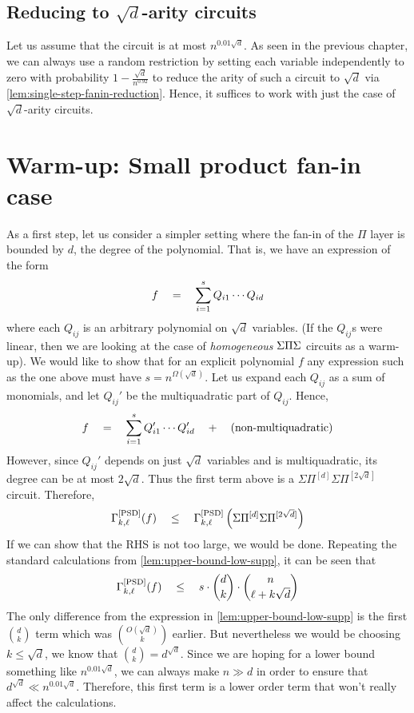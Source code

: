 \subsection*{Reducing to $\sqrt{d}$-arity circuits}

Let us assume that the circuit is at most $n^{0.01\sqrt{d}}$. As seen in the previous chapter, we can always use a random restriction by setting each variable independently to zero with probability $1 - \frac{\sqrt{d}}{n^{0.92}}$ to reduce the arity of such a circuit to $\sqrt{d}$ via \autoref{lem:single-step-fanin-reduction}. Hence, it suffices to work with just the case of $\sqrt{d}$-arity circuits. 



\section{Warm-up: Small product fan-in case}

As a first step, let us consider a simpler setting where the fan-in of the $\Pi$ layer is bounded by $d$, the degree of the polynomial. That is, we have an expression of the form
\[
f \quad = \quad \sum_{i=1}^s Q_{i1} \cdots Q_{id}
\]
where each $Q_{ij}$ is an arbitrary polynomial on $\sqrt{d}$ variables. (If the $Q_{ij}$s were linear, then we are looking at the case of \emph{homogeneous} $\Sigma\Pi\Sigma$ circuits as a warm-up). We would like to show that for an explicit polynomial $f$ any expression such as the one above must have $s = n^{\Omega(\sqrt{d})}$. Let us expand each $Q_{ij}$ as a sum of monomials, and let $Q_{ij}'$ be the multiquadratic part of $Q_{ij}$. Hence,
\[
f  \quad = \quad  \sum_{i=1}^s Q_{i1}' \cdots Q_{id}' \quad + \quad (\text{non-multiquadratic})
\]
However, since $Q_{ij}'$ depends on just $\sqrt{d}$ variables and is multiquadratic, its degree can be at most $2\sqrt{d}$. Thus the first term above is a $\Sigma\Pi^{[d]}\Sigma\Pi^{[2\sqrt{d}]}$ circuit. Therefore,
\[
\Gamma^{\mathrm{[PSD]}}_{k,\ell}(f) \quad \leq \quad \Gamma^{\mathrm{[PSD]}}_{k,\ell}\left(\Sigma\Pi^{[d]}\Sigma\Pi^{[2\sqrt{d}]}\right)
\]
If we can show that the RHS is not too large, we would be done. Repeating the standard calculations from \autoref{lem:upper-bound-low-supp}, it can be seen that
\[
\Gamma^{\mathrm{[PSD]}}_{k,\ell}(f) \quad \leq \quad s \cdot \binom{d}{k} \cdot \binom{n}{\ell + k\sqrt{d}}
\]
The only difference from the expression in \autoref{lem:upper-bound-low-supp} is the first $\binom{d}{k}$ term which was $\binom{O(\sqrt{d})}{k}$ earlier. But nevertheless we would be choosing $k \leq \sqrt{d}$, we know that $\binom{d}{k} = d^{\sqrt{d}}$. Since we are hoping for a lower bound something like $n^{0.01\sqrt{d}}$, we can always make $n \gg d$ in order to ensure that $d^{\sqrt{d}} \ll n^{0.01\sqrt{d}}$. Therefore, this first term is a lower order term that won't really affect the calculations. 

